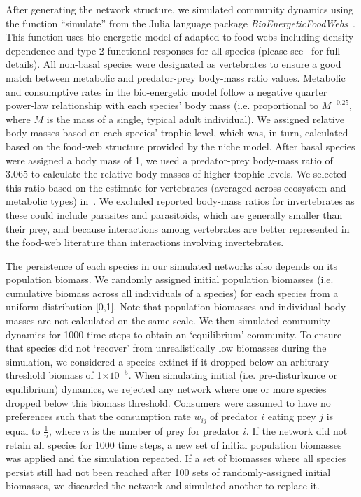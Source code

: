 \documentclass[12pt]{article}
\begin{document}
\begin{spacing}{2.0}
	After generating the network structure, we simulated community dynamics using the function ``simulate'' from the Julia language package \emph{BioEnergeticFoodWebs}~\citep{bioenergeticfw,Delmas2017}. This function uses bio-energetic model of \citet{Yodzis1992} adapted to food webs \citep{Williams2007} including density dependence and type 2 functional responses for all species (please see~\citet{Delmas2017} for full details).
	All non-basal species were designated as vertebrates to ensure a good match between metabolic and predator-prey body-mass ratio values. Metabolic and consumptive rates in the bio-energetic model follow a negative quarter power-law relationship with each species' body mass (i.e. proportional to $M^{-0.25}$, where $M$ is the mass of a single, typical adult individual). We assigned relative body masses based on each species' trophic level, which was, in turn, calculated based on the food-web structure provided by the niche model. After basal species were assigned a body mass of 1, we used a predator-prey body-mass ratio of 3.065 to calculate the relative body masses of higher trophic levels. We selected this ratio based on the estimate for vertebrates (averaged across ecosystem and metabolic types) in~\citet{Brose2006}. We excluded reported body-mass ratios for invertebrates as these could include parasites and parasitoids, which are generally smaller than their prey, and because interactions among vertebrates are better represented in the food-web literature than interactions involving invertebrates.
	
	
	The persistence of each species in our simulated networks also depends on its population biomass. 
	We randomly assigned initial population biomasses (i.e. cumulative biomass across all individuals of a species) for each species from a uniform distribution [0,1]. Note that population biomasses and individual body masses are not calculated on the same scale. We then simulated community dynamics for 1000 time steps to obtain an `equilibrium' community. To ensure that species did not `recover' from unrealistically low biomasses during the simulation, we considered a species extinct if it dropped below an arbitrary threshold biomass of 1$\times10^{-5}$. When simulating initial (i.e. pre-disturbance or equilibrium) dynamics, we rejected any network where one or more species dropped below this biomass threshold. Consumers were assumed to have no preferences such that the consumption rate $w_{ij}$ of predator $i$ eating prey $j$ is equal to $\frac{1}{n}$, where $n$ is the number of prey for predator $i$. If the network did not retain all species for 1000 time steps, a new set of initial population biomasses was applied and the simulation repeated.
	If a set of biomasses where all species persist still had not been reached after 100 sets of randomly-assigned initial biomasses, we discarded the network and simulated another to replace it.



\end{spacing}
\end{document}
